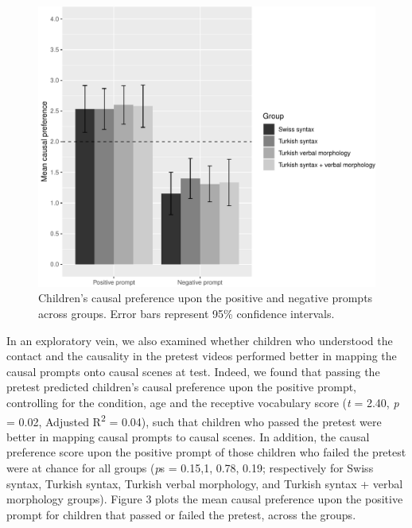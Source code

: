 \documentclass[man]{apa6}
\begin{document}
\begin{figure}[htbp]
\centering
\includegraphics{fig2-1.pdf}
\caption{\label{fig:fig2}Children's causal preference upon
the positive and negative prompts across groups. Error bars represent
95\% confidence intervals.}
\end{figure}

In an exploratory vein, we also examined whether children who understood
the contact and the causality in the pretest videos performed better in
mapping the causal prompts onto causal scenes at test. Indeed, we found
that passing the pretest predicted children's causal preference upon the
positive prompt, controlling for the condition, age and the receptive
vocabulary score (\emph{t} = 2.40, \emph{p} = 0.02, Adjusted
R\textsuperscript{2} = 0.04), such that children who passed the pretest
were better in mapping causal prompts to causal scenes. In addition, the
causal preference score upon the positive prompt of those children who
failed the pretest were at chance for all groups (\emph{p}s = 0.15,1,
0.78, 0.19; respectively for Swiss syntax, Turkish syntax, Turkish
verbal morphology, and Turkish syntax + verbal morphology groups).
Figure 3 plots the mean causal preference upon the positive prompt for
children that passed or failed the pretest, across the groups.
\end{document}
